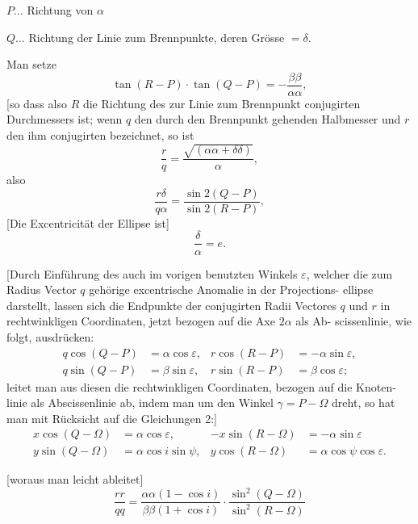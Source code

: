 \documentclass[12pt,a4paper]{article}
\begin{document}
$P \ldots$ Richtung von $\alpha$

$Q \ldots$ Richtung der Linie zum Brennpunkte, deren Gr\"osse $= \delta$.

Man setze
\begin{equation}\label{eq:6}
\tag{6}
\tan(R - P) \cdot \tan(Q - P) = -\frac{\beta\beta}{\alpha\alpha},
\end{equation}
[so dass also $R$ die Richtung des zur Linie zum Brennpunkt conjugirten
Durchmessers ist; wenn $q$ den durch den Brennpunkt gehenden Halbmesser
und $r$ den ihm conjugirten bezeichnet, so ist
\[
\frac{r}{q} = \frac{\sqrt{(\alpha\alpha + \delta\delta)}}{\alpha},
\]
also
\begin{equation}\label{eq:7}
\tag{7}
\frac{r\delta}{q\alpha} = \frac{\sin 2(Q - P)}{\sin 2(R - P)},
\end{equation}
[Die Excentricit\"at der Ellipse ist]
\begin{equation}\label{eq:9}
\tag{9}
\frac{\delta}{\alpha} = e.
\end{equation}

[Durch Einf\"uhrung des auch im vorigen benutzten Winkels $\varepsilon$, welcher
die zum Radius Vector $q$ geh\"orige excentrische Anomalie in der Projections-
ellipse darstellt, lassen sich die Endpunkte der conjugirten Radii Vectores $q$
und $r$ in rechtwinkligen Coordinaten, jetzt bezogen auf die Axe $2\alpha$ als Ab-
scissenlinie, wie folgt, ausdr\"ucken:
\begin{align*}
q\cos(Q - P) &= \alpha\cos\varepsilon, & r\cos(R - P) &= -\alpha\sin\varepsilon, \\
q\sin(Q - P) &= \beta\sin\varepsilon, & r\sin(R - P) &= \beta\cos\varepsilon;
\end{align*}
leitet man aus diesen die rechtwinkligen Coordinaten, bezogen auf die Knoten-
linie als Abscissenlinie ab, indem man um den Winkel $\gamma = P - \Omega$ dreht,
so hat man mit R\"ucksicht auf die Gleichungen 2:]
\begin{align*}
x\cos(Q - \Omega) &= \alpha\cos\varepsilon, & -x\sin(R - \Omega) &= -\alpha\sin\varepsilon \\
y\sin(Q - \Omega) &= \alpha\cos i\sin\psi, & y\cos(R - \Omega) &= \alpha\cos\psi\cos\varepsilon.
\end{align*}

\newpage

[woraus man leicht ableitet]
\begin{equation}\label{eq:11}
\tag{11}
\frac{rr}{qq} = \frac{\alpha\alpha(1 - \cos i)}{\beta\beta(1 + \cos i)} \cdot \frac{\sin^2(Q - \Omega)}{\sin^2(R - \Omega)}
\end{equation}
\end{document}

